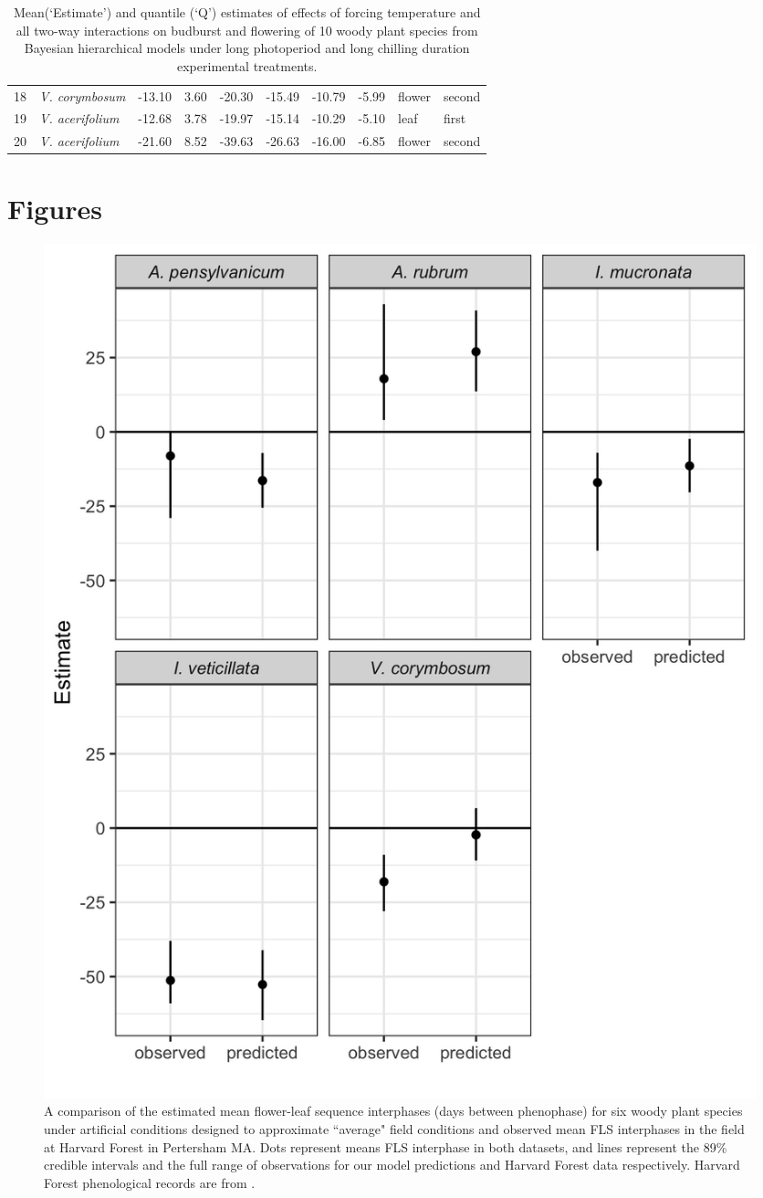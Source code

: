 \documentclass{article}\usepackage[]{graphicx}\usepackage[]{color}
\begin{document}
\begin{table}[ht]
\begin{tabular}{l>{\itshape}lllllllll}
  18 & V. corymbosum & -13.10 & 3.60 & -20.30 & -15.49 & -10.79 & -5.99 & flower & second \\ 
  19 & V. acerifolium & -12.68 & 3.78 & -19.97 & -15.14 & -10.29 & -5.10 & leaf & first \\ 
  20 & V. acerifolium & -21.60 & 8.52 & -39.63 & -26.63 & -16.00 & -6.85 & flower & second \\ 
   \hline
\end{tabular}
\caption{Mean(`Estimate') and quantile (`Q') estimates of effects of forcing temperature and all two-way interactions on budburst and flowering of 10 woody plant species from Bayesian hierarchical models under long photoperiod and long chilling duration experimental treatments. } 
\label{tab:phh}
\end{table}




\section*{Figures}

 \begin{figure}[!ht]
    \centering
 \includegraphics[width=.8\textwidth]{..//Plots/fieldmodcomparisions.jpeg}
    \caption{A comparison of the estimated mean flower-leaf sequence interphases (days between phenophase) for six woody plant species under artificial conditions designed to approximate ``average" field conditions and observed mean FLS interphases in the field at Harvard Forest in Pertersham MA. Dots represent means FLS interphase in both datasets, and lines represent the 89\% credible intervals and the full range of observations for our model predictions and Harvard Forest data respectively. Harvard Forest phenological records are from \citet{Okeefe2015}.}
    \label{fig:validate}
\end{figure}
\end{document}
